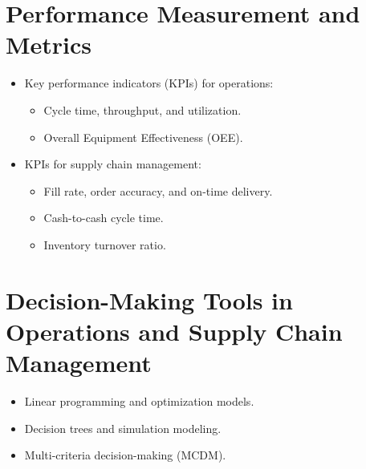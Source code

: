 \section{Performance Measurement and Metrics}
\begin{itemize}
    \item Key performance indicators (KPIs) for operations:
    \begin{itemize}
        \item Cycle time, throughput, and utilization.
        \item Overall Equipment Effectiveness (OEE).
    \end{itemize}
    \item KPIs for supply chain management:
    \begin{itemize}
        \item Fill rate, order accuracy, and on-time delivery.
        \item Cash-to-cash cycle time.
        \item Inventory turnover ratio.
    \end{itemize}
\end{itemize}

\section{Decision-Making Tools in Operations and Supply Chain Management}
\begin{itemize}
    \item Linear programming and optimization models.
    \item Decision trees and simulation modeling.
    \item Multi-criteria decision-making (MCDM).
\end{itemize}
